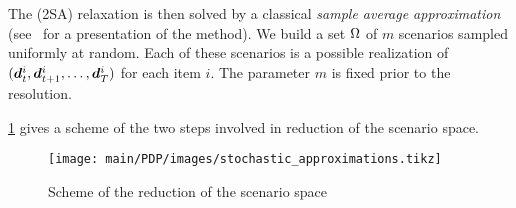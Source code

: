 The (2SA) relaxation is then solved by a classical {\em sample average approximation} (see~\citet{Kleywegt2002} for a presentation of the method).
We build a set $\Omega$ of $m$ scenarios sampled uniformly at random.
Each of these scenarios is a possible realization of $(\va\demand_t^i,\va\demand_{t+1}^i,\ldots,\va\demand_{\horizon}^i)$ for each item $i$.
The parameter $m$ is fixed prior to the resolution.


\cref{fig:scenario-space-reduction} gives a scheme of the two steps involved in reduction of the scenario space.
\begin{figure}[h]
  \centering
  \texttt{[image: main/PDP/images/stochastic\_approximations.tikz]}
  \caption{Scheme of the reduction of the scenario space}
  \label{fig:scenario-space-reduction}
\end{figure}


